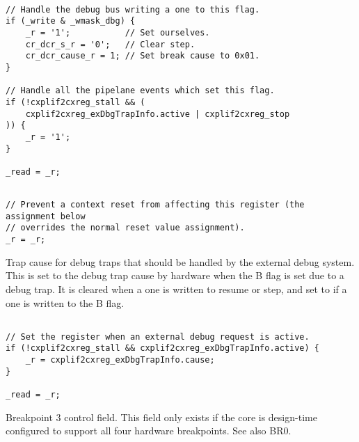 \declaration{}
\implementation{}
\begin{lstlisting}

// Handle the debug bus writing a one to this flag.
if (_write & _wmask_dbg) {
    _r = '1';           // Set ourselves.
    cr_dcr_s_r = '0';   // Clear step.
    cr_dcr_cause_r = 1; // Set break cause to 0x01.
}

// Handle all the pipelane events which set this flag.
if (!cxplif2cxreg_stall && (
    cxplif2cxreg_exDbgTrapInfo.active | cxplif2cxreg_stop
)) {
    _r = '1';
}

_read = _r;
\end{lstlisting}
\resetImplementation{}
\begin{lstlisting}

// Prevent a context reset from affecting this register (the assignment below
// overrides the normal reset value assignment).
_r = _r;

\end{lstlisting}

Trap cause for debug traps that should be handled by the external debug system.
This is set to the debug trap cause by hardware when the B flag is set due to a
debug trap. It is cleared when a one is written to resume or step, and set to
 if a one is written to the B flag.

\declaration{}
\implementation{}
\begin{lstlisting}

// Set the register when an external debug request is active.
if (!cxplif2cxreg_stall && cxplif2cxreg_exDbgTrapInfo.active) {
    _r = cxplif2cxreg_exDbgTrapInfo.cause;
}

_read = _r;
\end{lstlisting}

Breakpoint 3 control field. This field only exists if the core is design-time
configured to support all four hardware breakpoints. See also BR0.

